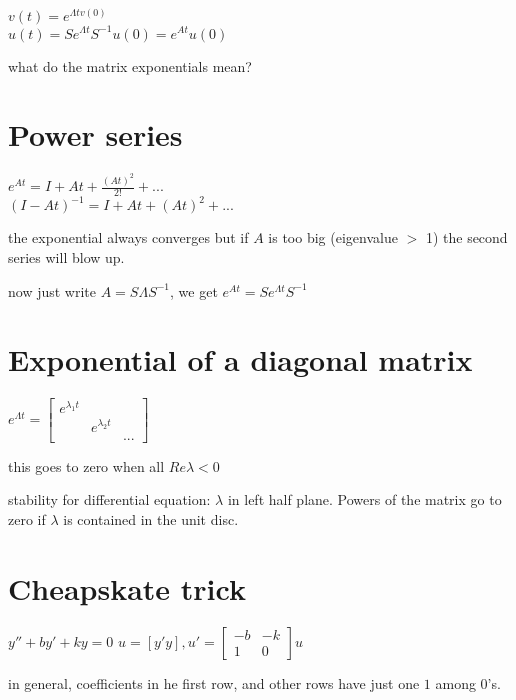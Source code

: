 \documentclass{article}
\begin{document}
$v(t) = e^{\Lambda t v(0)}$ \\
$u(t) = S e^{\Lambda t} S^{-1} u(0) = e^{At} u(0)$

what do the matrix exponentials mean?

\section{Power series}

$e^{At} = I + At + \frac{(At)^2}{2!} + ...$ \\
$(I-At)^{-1} = I + At + (At)^2 + ...$

the exponential always converges but if $A$ is too big (eigenvalue $>$ 1) the second series will blow up.

now just write $A = S\Lambda S^{-1}$, we get $e^{At} = S e^{\Lambda t} S^{-1}$

\section{Exponential of a diagonal matrix}

$e^{\Lambda t} = \begin{bmatrix}
e^{\lambda_1 t} \\
& e^{\lambda_2 t} \\
& & ...
\end{bmatrix}$

this goes to zero when all $Re \lambda < 0$

stability for differential equation: $\lambda$ in left half plane. Powers of the matrix go to zero if $\lambda$ is contained in the unit disc.

\section{Cheapskate trick}

$y'' + by' + ky = 0$
$u = [y' y], u' = \begin{bmatrix}
-b & -k \\
1 & 0
\end{bmatrix} u$

in general, coefficients in he first row, and other rows have just one $1$ among $0$'s.
\end{document}

